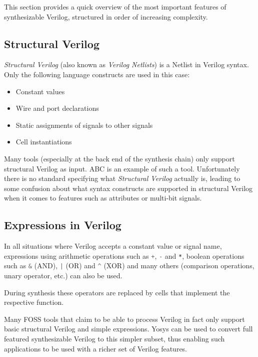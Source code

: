 This section provides a quick overview of the most important features of
synthesizable Verilog, structured in order of increasing complexity.

\subsection{Structural Verilog}

{\it Structural Verilog} (also known as {\it Verilog Netlists}) is a Netlist in
Verilog syntax. Only the following language constructs are used in this case:

\begin{itemize}
\item Constant values
\item Wire and port declarations
\item Static assignments of signals to other signals
\item Cell instantiations
\end{itemize}

Many tools (especially at the back end of the synthesis chain) only support
structural Verilog as input. ABC is an example of such a tool. Unfortunately
there is no standard specifying what {\it Structural Verilog} actually is,
leading to some confusion about what syntax constructs are supported in
structural Verilog when it comes to features such as attributes or multi-bit
signals.

\subsection{Expressions in Verilog}

In all situations where Verilog accepts a constant value or signal name,
expressions using arithmetic operations such as
\lstinline[language=Verilog]{+}, \lstinline[language=Verilog]{-} and \lstinline[language=Verilog]{*},
boolean operations such as
\lstinline[language=Verilog]{&} (AND), \lstinline[language=Verilog]{|} (OR) and \lstinline[language=Verilog]{^} (XOR)
and many others (comparison operations, unary operator, etc.) can also be used.

During synthesis these operators are replaced by cells that implement the respective function.

Many FOSS tools that claim to be able to process Verilog in fact only support
basic structural Verilog and simple expressions. Yosys can be used to convert
full featured synthesizable Verilog to this simpler subset, thus enabling such
applications to be used with a richer set of Verilog features.

